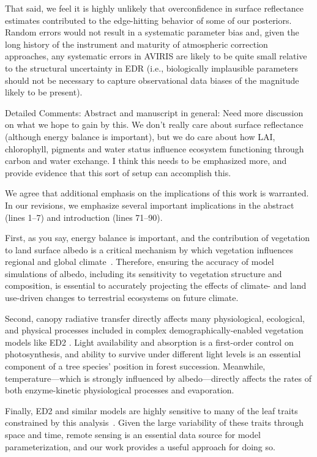 That said, we feel it is highly unlikely that overconfidence in surface reflectance estimates contributed to the edge-hitting behavior of some of our posteriors.
Random errors would not result in a systematic parameter bias and, given the long history of the instrument and maturity of atmospheric correction approaches, any systematic errors in AVIRIS are likely to be quite small relative to the structural uncertainty in EDR (i.e., biologically implausible parameters should not be necessary to capture observational data biases of the magnitude likely to be present).

\begin{reviewer}
  Detailed Comments:
  Abstract and manuscript in general: Need more discussion on what we hope to gain by this. We don’t really care about surface reflectance (although energy balance is important), but we do care about how LAI, chlorophyll, pigments and water status influence ecosystem functioning through carbon and water exchange. I think this needs to be emphasized more, and provide evidence that this sort of setup can accomplish this.
\end{reviewer}

We agree that additional emphasis on the implications of this work is warranted.
In our revisions, we emphasize several important implications in the abstract (lines 1--7) and introduction (lines 71--90).

First, as you say, energy balance is important, and the contribution of vegetation to land surface albedo is a critical mechanism by which vegetation influences regional and global climate~\citep{bonan2008forests}. Therefore, ensuring the accuracy of model simulations of albedo, including its sensitivity to vegetation structure and composition, is essential to accurately projecting the effects of climate- and land use-driven changes to terrestrial ecosystems on future climate.

Second, canopy radiative transfer directly affects many physiological, ecological, and physical processes included in complex demographically-enabled vegetation models like ED2 \citep{viskari_2019_influence}.
Light availability and absorption is a first-order control on photosynthesis, and ability to survive under different light levels is an essential component of a tree species’ position in forest succession.
Meanwhile, temperature---which is strongly influenced by albedo---directly affects the rates of both enzyme-kinetic physiological processes and evaporation.

Finally, ED2 and similar models are highly sensitive to many of the leaf traits constrained by this analysis~\citep{raczka_2018_what, dietze2014quantitative, shiklomanov2020structurea}.
Given the large variability of these traits through space and time, remote sensing is an essential data source for model parameterization, and our work provides a useful approach for doing so.


